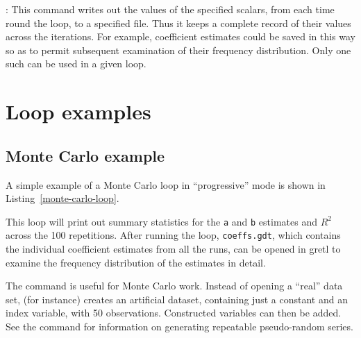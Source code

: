 : This command writes out the values of the specified
scalars, from each time round the loop, to a specified file.  Thus it
keeps a complete record of their values across the iterations.  For
example, coefficient estimates could be saved in this way so as to
permit subsequent examination of their frequency distribution.  Only
one such  can be used in a given loop.

\section{Loop examples}
\label{loop-examples}


\subsection{Monte Carlo example}
\label{loop-mc-example}

A simple example of a Monte Carlo loop in ``progressive'' mode is
shown in Listing~\ref{monte-carlo-loop}.

\begin{script}[htbp]
  \label{monte-carlo-loop}
\end{script}

This loop will print out summary statistics for the \texttt{a} and
\texttt{b} estimates and
$R^2$ across the 100 repetitions.  After running the loop,
\verb+coeffs.gdt+, which contains the individual coefficient estimates
from all the runs, can be opened in gretl to examine the frequency
distribution of the estimates in detail.

The  command is useful for Monte Carlo work.  Instead of
opening a ``real'' data set,  (for instance) creates
an artificial dataset, containing just a constant and an index
variable, with 50 observations. Constructed variables can then be
added.  See the  command for information on generating
repeatable pseudo-random series.

